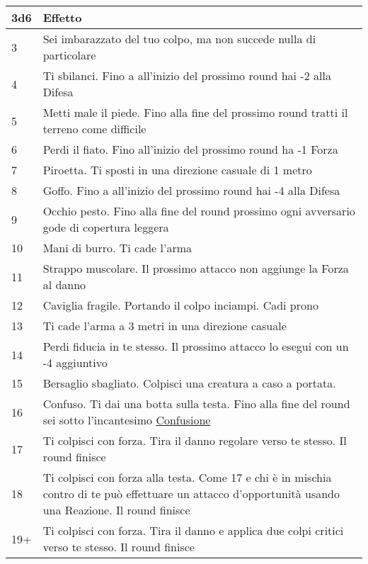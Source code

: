 {{\begin{multicols}{2}
\noindent\begin{tabularx}{\linewidth}{l|X}
	\toprule
\rowcolor{gray!20}\textbf{3d6} & \textbf{Effetto}\\
\toprule
3& Sei imbarazzato del tuo colpo, ma non succede nulla di particolare\\
\rowcolor{gray!20}4& Ti sbilanci. Fino a all'inizio del prossimo round hai -2 alla Difesa\\
5& Metti male il piede. Fino alla fine del prossimo round tratti il terreno come difficile\\
\rowcolor{gray!20}6& Perdi il fiato. Fino all'inizio del prossimo round ha -1 Forza\\
7& Piroetta. Ti sposti in una direzione casuale di 1 metro\\
\rowcolor{gray!20}8& Goffo. Fino a all'inizio del prossimo round hai -4 alla Difesa\\
9& Occhio pesto. Fino alla fine del round prossimo ogni avversario gode di copertura leggera\\
\rowcolor{gray!20}10 & Mani di burro. Ti cade l'arma\\
11 & Strappo muscolare. Il prossimo attacco non aggiunge la Forza al danno\\
\rowcolor{gray!20}12 & Caviglia fragile. Portando il colpo inciampi. Cadi prono\\
13 & Ti cade l'arma a 3 metri in una direzione casuale\\
\rowcolor{gray!20}14 & Perdi fiducia in te stesso. Il prossimo attacco lo esegui con un -4 aggiuntivo\\
15 & Bersaglio sbagliato. Colpisci una creatura a caso a portata.\\
\rowcolor{gray!20}16 & Confuso. Ti dai una botta sulla testa. Fino alla fine del round sei sotto l'incantesimo \hyperlink{Confusione}{Confusione}\\
17 & Ti colpisci con forza. Tira il danno regolare verso te stesso. Il round finisce\\
\rowcolor{gray!20}18 & Ti colpisci con forza alla testa. Come 17 e chi è in mischia contro di te può effettuare un attacco d'opportunità usando una Reazione. Il round finisce\\
19+& Ti colpisci con forza. Tira il danno e applica due colpi critici verso te stesso. Il round finisce
\end{tabularx}

\medskip

\end{multicols}

}}
